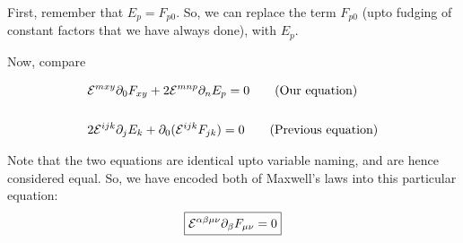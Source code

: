 First, remember that $E_p = F_{p 0}$. So, we can replace the term $F_{p 0}$
(upto fudging of constant factors that we have always done), with $E_p$.

Now, compare

\begin{align*}
    &\mathcal{E}^{m x y}  \partial_{0} F_{x y} + 
    2 \mathcal{E}^{m n p}   \partial_{n} E_p = 0 \tag{Our equation} \\
    \\
    &2\mathcal{E}^{ijk} \partial_j E_k  + \partial_0 (\mathcal{E}^{ijk} F_{jk})  = 0 \tag{Previous equation} \\
\end{align*}

Note that the two equations are identical upto variable naming, and are
hence considered equal. So, we have encoded both of Maxwell's
laws into this particular equation:
\begin{equation}
    \boxed{\mathcal{E}^{\alpha \beta \mu \nu}  \partial_{\beta} F_{\mu \nu} = 0}
\end{equation}
